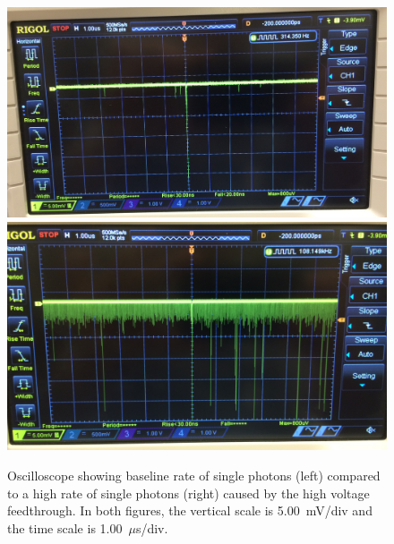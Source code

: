 \begin{figure}[htbp]
\begin{center}
\includegraphics[width=\halffig]{figures/testbed/baseline.jpg}
\includegraphics[width=\halffig]{figures/testbed/phog.jpg}
\caption{Oscilloscope showing baseline rate of single photons (left) compared to a high rate of single photons (right) caused by the high voltage feedthrough. In both figures, the vertical scale is 5.00~mV/div and the time scale is 1.00~$\mu$s/div.}
\label{fig:phog}
\end{center}
\end{figure}


